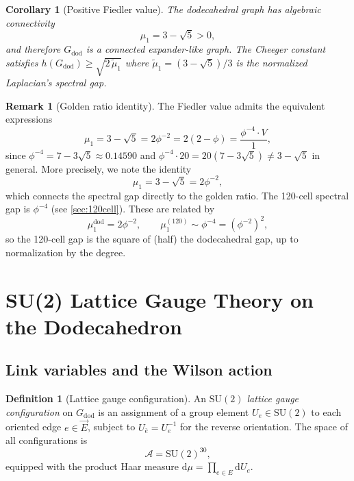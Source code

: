 \documentclass[12pt,a4paper]{article}
\newtheorem{corollary}[theorem]{Corollary}
\theoremstyle{definition}
\newtheorem{definition}[theorem]{Definition}
\newtheorem{remark}[theorem]{Remark}
\theoremstyle{remark}
\newcommand{\SU}{\mathrm{SU}}
\newcommand{\ph}{\phi}
\begin{document}
\begin{corollary}[Positive Fiedler value]\label{cor:fiedler}
The dodecahedral graph has algebraic connectivity
\[
  \mu_1 = 3 - \sqrt{5} > 0,
\]
and therefore $G_{\mathrm{dod}}$ is a connected expander-like graph.  The
Cheeger constant satisfies $h(G_{\mathrm{dod}}) \ge \sqrt{2\,\tilde\mu_1}$
where $\tilde\mu_1 = (3 - \sqrt{5})/3$ is the normalized Laplacian's
spectral gap.
\end{corollary}

\begin{remark}[Golden ratio identity]\label{rem:golden}
The Fiedler value admits the equivalent expressions
\begin{equation}\label{eq:fiedler_golden}
  \mu_1 = 3 - \sqrt{5} = 2\ph^{-2} = 2(2 - \ph) = \frac{\ph^{-4} \cdot V}{1},
\end{equation}
since $\ph^{-4} = 7 - 3\sqrt{5} \approx 0.14590$ and
$\ph^{-4} \cdot 20 = 20(7 - 3\sqrt{5}) \ne 3 - \sqrt{5}$ in general.
More precisely, we note the identity
\[
  \mu_1 = 3 - \sqrt{5} = 2\ph^{-2},
\]
which connects the spectral gap directly to the golden ratio.
The 120-cell spectral gap is $\ph^{-4}$ (see \cref{sec:120cell}).
These are related by
\[
  \mu_1^{\text{dod}} = 2\ph^{-2}, \qquad
  \mu_1^{(120)} \sim \ph^{-4} = (\ph^{-2})^2,
\]
so the 120-cell gap is the square of (half) the dodecahedral gap,
up to normalization by the degree.
\end{remark}

\section{SU(2) Lattice Gauge Theory on the Dodecahedron}\label{sec:lgt}

\subsection{Link variables and the Wilson action}\label{ssec:wilson}

\begin{definition}[Lattice gauge configuration]\label{def:config}
An \emph{$\SU(2)$ lattice gauge configuration} on $G_{\mathrm{dod}}$
is an assignment of a group element $U_e \in \SU(2)$ to each oriented
edge $e \in \vec{E}$, subject to $U_{\bar{e}} = U_e^{-1}$ for the
reverse orientation.  The space of all configurations is
\[
  \mathcal{A} = \SU(2)^{30},
\]
equipped with the product Haar measure $\mathrm{d}\mu = \prod_{e \in E} \mathrm{d}U_e$.
\end{definition}
\end{document}
